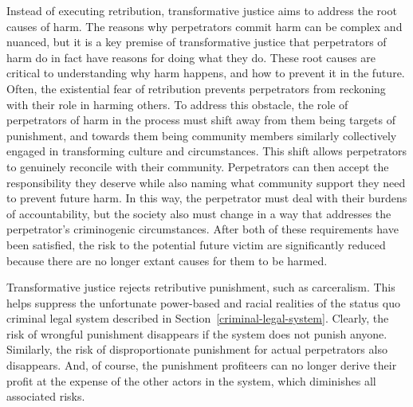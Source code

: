 \documentclass{article}
\begin{document}
        Instead of executing retribution, transformative justice aims to address the root causes of harm. The reasons why perpetrators commit harm can be complex and nuanced, but it is a key premise of transformative justice that perpetrators of harm do in fact have reasons for doing what they do. These root causes are critical to understanding why harm happens, and how to prevent it in the future. Often, the existential fear of retribution prevents perpetrators from reckoning with their role in harming others. To address this obstacle, the role of perpetrators of harm in the process must shift away from them being targets of punishment, and towards them being community members similarly collectively engaged in transforming culture and circumstances. This shift allows perpetrators to genuinely reconcile with their community. Perpetrators can then accept the responsibility they deserve while also naming what community support they need to prevent future harm. In this way, the perpetrator must deal with their burdens of accountability, but the society also must change in a way that addresses the perpetrator's criminogenic circumstances. After both of these requirements have been satisfied, the risk to the potential future victim are significantly reduced because there are no longer extant causes for them to be harmed. 

        Transformative justice rejects retributive punishment, such as carceralism. This helps suppress the unfortunate power-based and racial realities of the status quo criminal legal system described in Section~\ref{criminal-legal-system}. Clearly, the risk of wrongful punishment disappears if the system does not punish anyone. Similarly, the risk of disproportionate punishment for actual perpetrators also disappears. And, of course, the punishment profiteers can no longer derive their profit at the expense of the other actors in the system, which diminishes all associated risks. 


\end{document}
